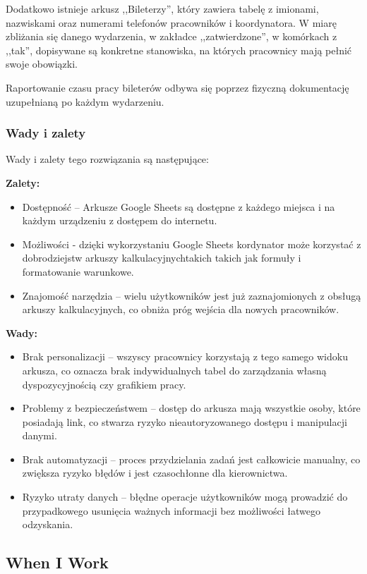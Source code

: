 \documentclass[shortabstract]{iithesis}
\begin{document}
Dodatkowo istnieje arkusz ,,Bileterzy'', który zawiera tabelę z imionami, nazwiskami oraz numerami telefonów pracowników i koordynatora. W miarę zbliżania się danego wydarzenia, w zakładce ,,zatwierdzone'', w komórkach z ,,tak'', dopisywane są konkretne stanowiska, na których pracownicy mają pełnić swoje obowiązki.

Raportowanie czasu pracy bileterów odbywa się poprzez fizyczną dokumentację uzupełnianą po każdym wydarzeniu.


\subsubsection{Wady i zalety}
Wady i zalety tego rozwiązania są następujące:

\textbf{Zalety:}
\begin{itemize}
  \item Dostępność – Arkusze Google Sheets są dostępne z każdego miejsca i na każdym urządzeniu z dostępem do internetu.
  \item Możliwości - dzięki wykorzystaniu Google Sheets kordynator może korzystać z dobrodziejstw arkuszy kalkulacyjnychtakich takich jak formuły i formatowanie warunkowe.
  \item Znajomość narzędzia – wielu użytkowników jest już zaznajomionych z obsługą arkuszy kalkulacyjnych, co obniża próg wejścia dla nowych pracowników.
\end{itemize}

\newpage

\textbf{Wady:}
\begin{itemize}
  \item Brak personalizacji – wszyscy pracownicy korzystają z tego samego widoku arkusza, co oznacza brak indywidualnych tabel do zarządzania własną dyspozycyjnością czy grafikiem pracy.
  \item Problemy z bezpieczeństwem – dostęp do arkusza mają wszystkie osoby, które posiadają link, co stwarza ryzyko nieautoryzowanego dostępu i manipulacji danymi.
  \item Brak automatyzacji – proces przydzielania zadań jest całkowicie manualny, co zwiększa ryzyko błędów i jest czasochłonne dla kierownictwa.
  \item Ryzyko utraty danych – błędne operacje użytkowników mogą prowadzić do przypadkowego usunięcia ważnych informacji bez możliwości łatwego odzyskania.
\end{itemize}


\subsection{When I Work}
\end{document}
